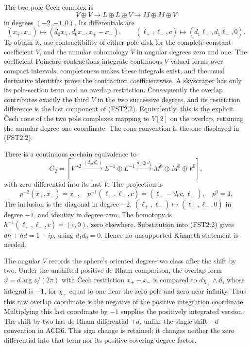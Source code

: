 The two-pole Čech complex is \[
V\oplus V\longrightarrow L\oplus L\oplus V
\longrightarrow M\oplus M\oplus V
\tag{FST2.1}
\] in degrees \((-2,-1,0)\). Its differentials are \[
(x_+,x_-)\longmapsto(d_0x_+,d_0x_-,x_+-x_-),
\qquad(\ell_+,\ell_-,c)\longmapsto(d_1\ell_+,d_1\ell_-,0).
\tag{FST2.2}
\] To obtain it, use contractibility of either pole disk for the
complete constant coefficient \(V\), and the annular cohomology \(V\) in
angular degrees zero and one. The coefficient Poincaré contractions
integrate continuous \(V\)-valued forms over compact intervals;
completeness makes these integrals exist, and the usual derivative
identities prove the contraction coefficientwise. A skyscraper has only
its pole-section term and no overlap restriction. Consequently the
overlap contributes exactly the third \(V\) in the two successive
degrees, and its restriction difference is the last component of
(FST2.2). Equivalently, this is the explicit Čech cone of the two pole
complexes mapping to \(V[2]\) on the overlap, retaining the annular
degree-one coordinate. The cone convention is the one displayed in
(FST2.2).

There is a continuous cochain equivalence to \[
G_2=[V^{-2}\xrightarrow{(d_0,d_0)}L^{-1}\oplus L^{-1}
\xrightarrow{d_1\oplus d_1}M^0\oplus M^0\oplus V^0],
\tag{FST2.3}
\] with zero differential into its last \(V\). The projection is \[
p^{-2}(x_+,x_-)=x_-,\quad
p^{-1}(\ell_+,\ell_-,c)=(\ell_+-d_0c,\ell_-),\quad p^0=1.
\tag{FST2.4}
\] The inclusion is the diagonal in degree \(-2\),
\((\ell_+,\ell_-)\mapsto(\ell_+,\ell_-,0)\) in degree \(-1\), and
identity in degree zero. The homotopy is
\(h^{-1}(\ell_+,\ell_-,c)=(c,0)\), zero elsewhere. Substitution into
(FST2.2) gives \(dh+hd=1-ip\), using \(d_1d_0=0\). Hence no unsupported
Künneth statement is needed.

The angular \(V\) records the sphere's oriented degree-two class after
the shift by two. Under the unshifted positive de Rham comparison, the
overlap form \(\vartheta=d\arg z/(2\pi)\) with Čech restriction
\(x_+-x_-\) is compared to \(d\chi_+\wedge\vartheta\), whose integral is
\(-1\), for \(\chi_+\) equal to one near the zero pole and zero near
infinity. Thus this raw overlap coordinate is the negative of the
positive integration coordinate. Multiplying this last coordinate by
\(-1\) supplies the positively integrated version. The shift by two has
de Rham differential \(+d\), unlike the single-shift \(-d\) convention
in ACD6. This sign change is retained; it changes neither the zero
differential into that term nor its positive covering-degree factor.

